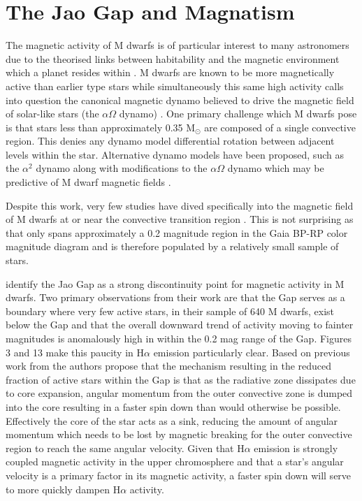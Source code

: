 \section{The Jao Gap and Magnatism}\label{sec:intro}
The magnetic activity of M dwarfs is of particular interest to many astronomers
due to the theorised links between habitability and the magnetic environment
which a planet resides within \citep[e.g.][]{Lammer2012,Gallet2017,
Kislyakova2017}. M dwarfs are known to be more magnetically active than earlier
type stars \citep{Saar1985,Astudillo-Defru2017,Wright2018} while simultaneously
this same high activity calls into question the canonical magnetic dynamo
believed to drive the magnetic field of solar-like stars (the $\alpha\Omega$
dynamo) \citep{Shulyak2015}. One primary challenge which M dwarfs pose is that
stars less than approximately 0.35 M$_{\odot}$ are composed of a single
convective region. This denies any dynamo model differential rotation between
adjacent levels within the star. Alternative dynamo models have been proposed,
such as the $\alpha^{2}$ dynamo along with modifications to the $\alpha\Omega$
dynamo which may be predictive of M dwarf magnetic fields \citep{Chabrier2006,
Kochukhov2021, Kleeorin2023}.

Despite this work, very few studies have dived specifically into the magnetic
field of M dwarfs at or near the convective transition region . This is not
surprising as that only spans approximately a 0.2 magnitude region
in the Gaia BP-RP color magnitude diagram and is therefore populated by a
relatively small sample of stars. 

\citet{Jao2023} identify the Jao Gap as a strong discontinuity point for
magnetic activity in M dwarfs. Two primary observations from their work are
that the Gap serves as a boundary where very few active stars, in their sample
of 640 M dwarfs, exist below the Gap and that the overall downward trend of
activity moving to fainter magnitudes is anomalously high in within the 0.2 mag
range of the Gap. \citeauthor{Jao2023} Figures 3 and 13 make this paucity in
H$\alpha$ emission particularly clear. Based on previous work from
\citet{Spada2020, Curtis2020, Dungee2022} the authors propose that the
mechanism resulting in the reduced fraction of active stars within the Gap is
that as the radiative zone dissipates due to core expansion, angular momentum
from the outer convective zone is dumped into the core resulting in a faster
spin down than would otherwise be possible. Effectively the core of the star
acts as a sink, reducing the amount of angular momentum which needs to be lost
by magnetic breaking for the outer convective region to reach the same angular
velocity. Given that H$\alpha$ emission is strongly coupled magnetic activity
in the upper chromosphere \citep{Newton2016, Kumar2023} and that a star's angular velocity
is a primary factor in its magnetic activity, a faster spin down will serve to
more quickly dampen H$\alpha$ activity.

